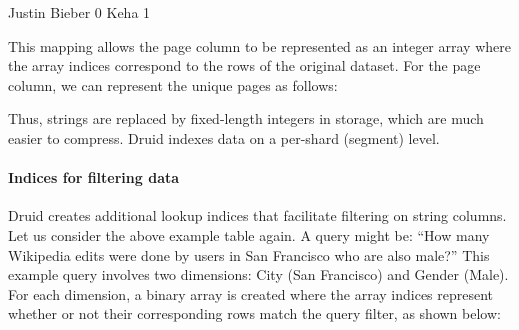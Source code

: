 \documentclass[letterpaper,10pt,english]{sphinxmanual}
\begin{document}
\begin{sphinxVerbatim}[commandchars=\\\{\}]
Justin Bieber \PYGZhy{}\PYGZgt{} 0
Ke\PYGZdl{}ha \PYGZhy{}\PYGZgt{} 1
\end{sphinxVerbatim}

This mapping allows the page column to be represented as an integer array where the array indices correspond to the rows of the original dataset. For the page column, we can represent the unique pages as follows:

\begin{sphinxVerbatim}[commandchars=\\\{\}]
\PYG{p}{[}   \PYG{p}{]}
\end{sphinxVerbatim}

Thus, strings are replaced by fixed-length integers in storage, which are much easier to compress. Druid indexes data on a per-shard (segment) level.


\paragraph{Indices for filtering data}
\label{\detokenize{discovery/part01/druid_features:id4}}
Druid creates additional lookup indices that facilitate filtering on string columns. Let us consider the above example table again. A query might be: “How many Wikipedia edits were done by users in San Francisco who are also male?” This example query involves two dimensions: City (San Francisco) and Gender (Male). For each dimension, a binary array is created where the array indices represent whether or not their corresponding rows match the query filter, as shown below:

\begin{sphinxVerbatim}[commandchars=\\\{\}]
     \PYG{p}{[}\PYG{p}{]}  \PYG{p}{[}\PYG{p}{]}\PYG{p}{[}\PYG{p}{]}\PYG{p}{[}\PYG{p}{]}\PYG{p}{[}\PYG{p}{]}
    \PYG{p}{[}   \PYG{p}{]}  \PYG{p}{[}\PYG{p}{]}\PYG{p}{[}\PYG{p}{]}\PYG{p}{[}\PYG{p}{]}\PYG{p}{[}\PYG{p}{]}
\end{sphinxVerbatim}
\end{document}
